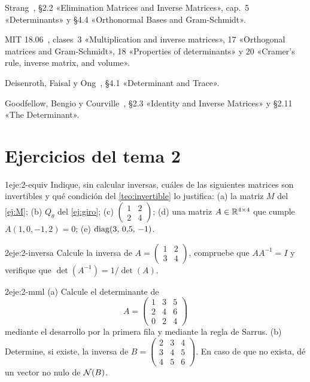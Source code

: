 \begin{lecturas}
\item Strang~\cite{strang-ila}, §2.2 «Elimination Matrices and Inverse Matrices», cap.~5 «Determinants» y §4.4 «Orthonormal Bases and Gram-Schmidt».
\item MIT 18.06~\cite{mit1806}, clases~3 «Multiplication and inverse matrices», 17 «Orthogonal matrices and Gram-Schmidt», 18 «Properties of determinants» y 20 «Cramer's rule, inverse matrix, and volume».
\item Deisenroth, Faisal y Ong~\cite{mml}, §4.1 «Determinant and Trace».
\item Goodfellow, Bengio y Courville~\cite{gbc}, §2.3 «Identity and Inverse Matrices» y §2.11 «The Determinant».
\end{lecturas}

\section*{Ejercicios del tema 2}

\begin{ejercicio}{1}{eje:2-equiv}
Indique, sin calcular inversas, cuáles de las siguientes matrices son invertibles y qué condición del \cref{teo:invertible} lo justifica: (a) la matriz $M$ del \cref{ej:M}; (b) $Q_\theta$ del \cref{ej:giro}; (c) $\begin{pmatrix}1&2\\2&4\end{pmatrix}$; (d) una matriz $A\in\mathbb{R}^{4\times 4}$ que cumple $A(1,0,-1,2)=0$; (e) $\operatorname{diag}(3,\,0{,}5,\,-1)$.
\end{ejercicio}

\begin{ejercicio}{2}{eje:2-inversa}
Calcule la inversa de $A=\begin{pmatrix}1&2\\3&4\end{pmatrix}$, compruebe que $AA^{-1}=I$ y verifique que $\det(A^{-1})=1/\det(A)$.
\end{ejercicio}

\begin{ejercicio}{2}{eje:2-mml}
(a) Calcule el determinante de
\[
A=\begin{pmatrix}1&3&5\\2&4&6\\0&2&4\end{pmatrix}
\]
mediante el desarrollo por la primera fila y mediante la regla de Sarrus. (b) Determine, si existe, la inversa de $B=\begin{pmatrix}2&3&4\\3&4&5\\4&5&6\end{pmatrix}$. En caso de que no exista, dé un vector no nulo de $\mathcal{N}(B)$.
\end{ejercicio}

